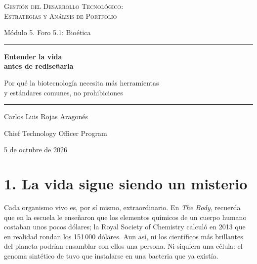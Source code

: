 \documentclass[11pt,letterpaper]{article}
\begin{document}
\begin{titlepage}
\centering
\vspace*{3.2cm}
{\large\scshape Gestión del Desarrollo Tecnológico:\\
Estrategias y Análisis de Portfolio\par}
\vspace{0.5cm}
{\normalsize Módulo 5. Foro 5.1: Bioética\par}
\vspace{2.6cm}
{\color{cEje}\rule{0.55\textwidth}{0.8pt}\par}
\vspace{0.7cm}
{\LARGE\bfseries Entender la vida\\[0.2em]
antes de rediseñarla\par}
\vspace{0.5cm}
{\large Por qué la biotecnología necesita más herramientas\\
y estándares comunes, no prohibiciones\par}
\vspace{0.7cm}
{\color{cEje}\rule{0.55\textwidth}{0.8pt}\par}
\vfill
{\large Carlos Luis Rojas Aragonés\par}
\vspace{0.3cm}
{\normalsize Chief Technology Officer Program\par}
\vspace{0.3cm}
{\normalsize 5 de octubre de 2026\par}
\vspace*{1.5cm}
\end{titlepage}

\section*{1. La vida sigue siendo un misterio}

Cada organismo vivo es, por sí mismo, extraordinario. En \emph{The Body},
\textcite{bryson2019} recuerda que en la escuela le enseñaron que los
elementos químicos de un cuerpo humano costaban unos pocos dólares; la Royal
Society of Chemistry calculó en 2013 que en realidad rondan los 151\,000
dólares. Aun así, ni los científicos más brillantes del planeta podrían
ensamblar con ellos una persona. Ni siquiera una célula: el genoma sintético
de \textcite{gibson2010} tuvo que instalarse en una bacteria que ya existía.
\end{document}
